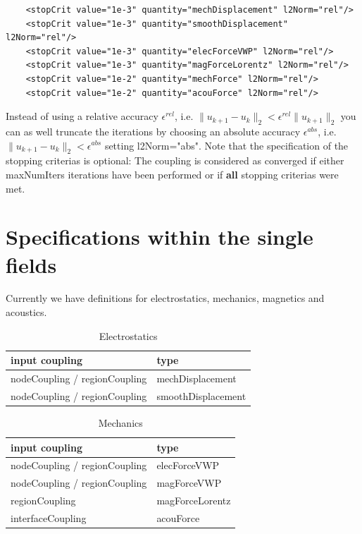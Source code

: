 \begin{verbatim}
    <stopCrit value="1e-3" quantity="mechDisplacement" l2Norm="rel"/>
    <stopCrit value="1e-3" quantity="smoothDisplacement" l2Norm="rel"/>
    <stopCrit value="1e-3" quantity="elecForceVWP" l2Norm="rel"/>
    <stopCrit value="1e-3" quantity="magForceLorentz" l2Norm="rel"/>
    <stopCrit value="1e-2" quantity="mechForce" l2Norm="rel"/>
    <stopCrit value="1e-2" quantity="acouForce" l2Norm="rel"/>

\end{verbatim}
Instead of using a relative accuracy $\epsilon^{rel}$, i.e. $\|u_{k+1}-u_k\|_2 < \epsilon^{rel} \|u_{k+1}\|_2$ you can as well
truncate the iterations by choosing an absolute accuracy $\epsilon^{abs}$, i.e. $\|u_{k+1}-u_k\|_2 < \epsilon^{abs}$ setting {\sf
l2Norm="abs"}. Note that the specification of the stopping criterias
is optional: The coupling is considered as converged if either {\sf
  maxNumIters} iterations have been performed or if {\bf all} stopping
criterias were met.


\section{Specifications within the single fields}
Currently we have definitions for electrostatics, mechanics, magnetics and acoustics.

\begin{table}[htb]
\begin{center}
\caption{Electrostatics}
\bigskip
\begin{tabular}{l|l}
input coupling & type \\\hline \hline
nodeCoupling / regionCoupling & mechDisplacement \\
nodeCoupling / regionCoupling & smoothDisplacement 
\end{tabular}
\end{center}
\end{table}

\begin{table}[htb]
\begin{center}
\caption{Mechanics}
\bigskip
\begin{tabular}{l|l}
input coupling    & type \\\hline \hline
nodeCoupling / regionCoupling     & elecForceVWP \\
nodeCoupling / regionCoupling    & magForceVWP \\
regionCoupling    & magForceLorentz \\
interfaceCoupling & acouForce 
\end{tabular}
\end{center}
\end{table}


